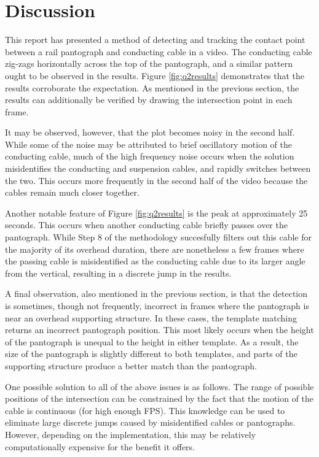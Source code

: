 \newpage
\section{Discussion}

This report has presented a method of detecting and tracking the contact point between a rail pantograph and conducting cable in a video. The conducting cable zig-zags horizontally across the top of the pantograph, and a similar pattern ought to be observed in the results. Figure \ref{fig:q2results} demonstrates that the results corroborate the expectation. As mentioned in the previous section, the results can additionally be verified by drawing the intersection point in each frame.

It may be observed, however, that the plot becomes noisy in the second half. While some of the noise may be attributed to brief oscillatory motion of the conducting cable, much of the high frequency noise occurs when the solution misidentifies the conducting and suspension cables, and rapidly switches between the two. This occurs more frequently in the second half of the video because the cables remain much closer together.

Another notable feature of Figure \ref{fig:q2results} is the peak at approximately 25 seconds. This occurs when another conducting cable briefly passes over the pantograph. While Step 8 of the methodology succesfully filters out this cable for the majority of its overhead duration, there are nonetheless a few frames where the passing cable is misidentified as the conducting cable due to its larger angle from the vertical, resulting in a discrete jump in the results.

A final observation, also mentioned in the previous section, is that the detection is sometimes, though not frequently, incorrect in frames where the pantograph is near an overhead supporting structure. In these cases, the template matching returns an incorrect pantograph position. This most likely occurs when the height of the pantograph is unequal to the height in either template. As a result, the size of the pantograph is slightly different to both templates, and parts of the supporting structure produce a better match than the pantograph.

One possible solution to all of the above issues is as follows. The range of possible positions of the intersection can be constrained by the fact that the motion of the cable is continuous (for high enough FPS). This knowledge can be used to eliminate large discrete jumps caused by misidentified cables or pantographs. However, depending on the implementation, this may be relatively computationally expensive for the benefit it offers.

